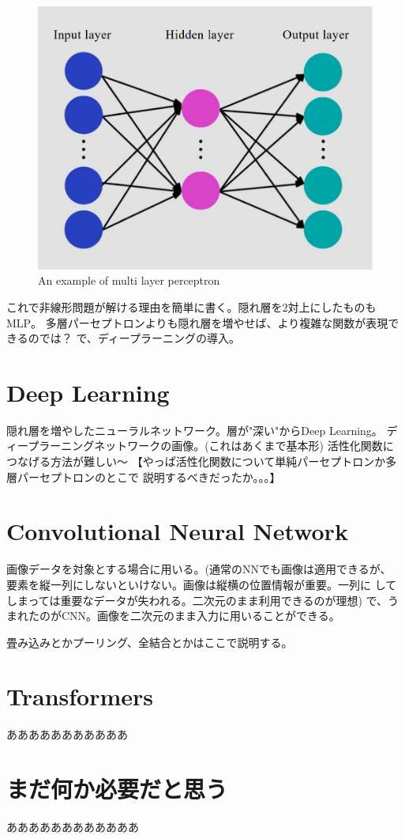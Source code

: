 \begin{figure}[h]
  \centering
  \includegraphics[width=130truemm]{resources/2_background/multi_layer_perceptron.png}
  \caption{
    An example of multi layer perceptron
  }
  \label{multilayer_perceptron}
\end{figure}

これで非線形問題が解ける理由を簡単に書く。隠れ層を2対上にしたものもMLP。
多層パーセプトロンよりも隠れ層を増やせば、より複雑な関数が表現できるのでは？
で、ディープラーニングの導入。

\cite{dastres:hal-03349542}

\section{Deep Learning}
隠れ層を増やしたニューラルネットワーク。層が"深い"からDeep Learning。
ディープラーニングネットワークの画像。(これはあくまで基本形)
活性化関数につなげる方法が難しい～
【やっぱ活性化関数について単純パーセプトロンか多層パーセプトロンのとこで
説明するべきだったか。。。】

\section{Convolutional Neural Network}
画像データを対象とする場合に用いる。(通常のNNでも画像は適用できるが、
要素を縦一列にしないといけない。画像は縦横の位置情報が重要。一列に
してしまっては重要なデータが失われる。二次元のまま利用できるのが理想)
で、うまれたのがCNN。画像を二次元のまま入力に用いることができる。

畳み込みとかプーリング、全結合とかはここで説明する。

\section{Transformers}
あああああああああああ

\section{まだ何か必要だと思う} 
ああああああああああああ